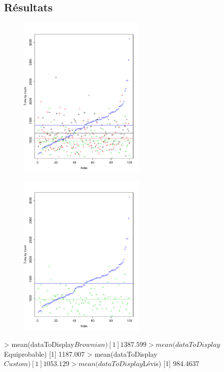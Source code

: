 \subsection{Résultats}


\begin{figure}[H]
	\begin{center}
		\includegraphics[height=8cm]{diagrams/100Tr10Clts_all.pdf}
		\caption{}
		\label{fig:}
	\end{center}
\end{figure}


\begin{figure}[H]
	\begin{center}
		\includegraphics[height=8cm]{diagrams/100Tr10Clts_brow_levis.pdf}
		\caption{}
		\label{fig:}
	\end{center}
\end{figure}

> mean(dataToDisplay$Brownian)
[1] 1387.599
> mean(dataToDisplay$Equiprobable)
[1] 1187.007
> mean(dataToDisplay$Custom)
[1] 1053.129
> mean(dataToDisplay$Lévis)
[1] 984.4637